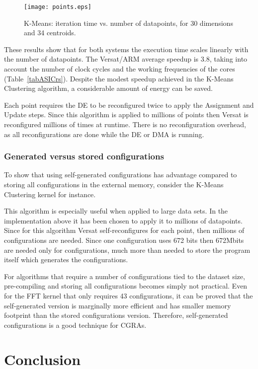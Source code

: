 \documentclass[journal]{IEEEtran}
\begin{document}
\begin{figure}[!h]
  \centering \texttt{[image: points.eps]}
  \caption{K-Means: iteration time vs. number of datapoints, for 30 dimensions and 34 centroids.}
  \label{fig:timeVSdpts}
\end{figure}

These results show that for both systems the execution time scales
linearly with the number of datapoints. The Versat/ARM average speedup
is $3.8$, taking into account the number of clock cycles and the
working frequencies of the cores (Table~\ref{tabASICrs}). Despite the
modest speedup achieved in the K-Means Clustering algorithm, a
considerable amount of energy can be saved.

Each point requires the DE to be reconfigured twice to apply the
Assignment and Update steps. Since this algorithm is applied to
millions of points then Versat is reconfigured millions of times at
runtime. There is no reconfiguration overhead, as all reconfigurations
are done while the DE or DMA is running.

\subsubsection{Generated versus stored configurations}

To show that using self-generated configurations has advantage
compared to storing all configurations in the external memory,
consider the K-Means Clustering kernel for instance.

This algorithm is especially useful when applied to large data
sets. In the implementation above it has been chosen to apply it to
millions of datapoints. Since for this algorithm Versat
self-reconfigures for each point, then millions of configurations are
needed. Since one configuration uses 672 bits then 672Mbits are needed
only for configurations, much more than needed to store the program
itself which generates the configurations.

For algorithms that require a number of configurations tied to the
dataset size, pre-compiling and storing all configurations becomes
simply not practical. Even for the FFT kernel that only requires 43
configurations, it can be proved that the self-generated version is
marginally more efficient and has smaller memory footprint than the
stored configurations version. Therefore, self-generated
configurations is a good technique for CGRAs.


\section{Conclusion}
\end{document}

